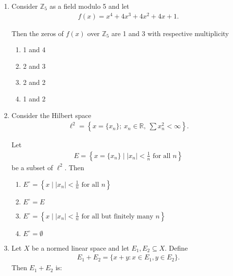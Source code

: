 \documentclass[journal]{IEEEtran}
\numberwithin{equation}{enumi}
\numberwithin{figure}{enumi}
\begin{document}
\begin{enumerate}
\item Consider $\mathbb{Z}_5$ as a field modulo 5 and let   \hfill{}  
   \begin{align*}
    f(x) = x^4 + 4x^3 + 4x^2 + 4x + 1.
    \end{align*}

    Then the zeros of $f(x)$ over $\mathbb{Z}_5$ are 1 and 3 with respective multiplicity
\begin{multicols}{4}
\begin{enumerate}
    \item 1 and 4
    \item 2 and 3 
    \item 2 and 2
    \item  1 and 2
\end{enumerate}
\end{multicols}
    
 
\item Consider the Hilbert space   \hfill{}  
    \begin{align*}
    \ell^2 = \left\{ x = \{x_n\};\ x_n \in \mathbb{R},\ \sum x_n^2 < \infty \right\}.
    \end{align*}

    Let
    \begin{align*}
    E = \left\{ x = \{x_n\} \mid |x_n| < \frac{1}{n} \text{ for all } n \right\}
    \end{align*}
    be a subset of $\ell^2$. Then
    
    \begin{enumerate}
        
        \item $E^\circ = \left\{ x \mid |x_n| < \frac{1}{n} \text{ for all } n \right\}$
        \item $E^\circ = E$
        \item $E^\circ = \left\{ x \mid |x_n| < \frac{1}{n} \text{ for all but finitely many } n \right\}$
        \item $E^\circ = \emptyset$
    \end{enumerate}
    

   
\item Let $X$ be a normed linear space and let $E_1, E_2 \subseteq X$. Define
    \begin{align*}
    E_1 + E_2 = \{x + y : x \in E_1, y \in E_2\}.
    \end{align*}
    Then $E_1 + E_2$ is:      \hfill{}
   

\end{enumerate}
\end{document}
